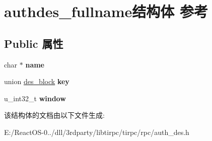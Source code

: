 \hypertarget{structauthdes__fullname}{}\section{authdes\+\_\+fullname结构体 参考}
\label{structauthdes__fullname}
\subsection*{Public 属性}
\begin{DoxyCompactItemize}
\item 
\mbox{\label{structauthdes__fullname_a6b9cc35a6e296e270904244592ae8660}} 
char $\ast$ {\bfseries name}
\item 
\mbox{\label{structauthdes__fullname_aa44c739596cee636a1db5593161ba632}} 
union \hyperlink{uniondes__block}{des\+\_\+block} {\bfseries key}
\item 
\mbox{\label{structauthdes__fullname_a66364317286296cfbb300619844108a1}} 
u\+\_\+int32\+\_\+t {\bfseries window}
\end{DoxyCompactItemize}


该结构体的文档由以下文件生成\+:\begin{DoxyCompactItemize}
\item 
E\+:/\+React\+O\+S-\/0../dll/3rdparty/libtirpc/tirpc/rpc/auth\+\_\+des.\+h\end{DoxyCompactItemize}
